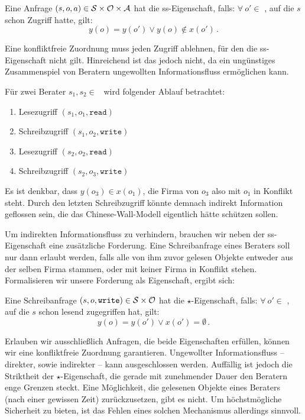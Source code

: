 \begin{definition}\indexCWSimpleSecurity
  Eine Anfrage $(s, o, a) \in \mathcal{S} \times \mathcal{O} \times \mathcal{A}$ hat die
  ss-Eigenschaft, falls: \(\forall\ o' \in\) \calO, auf die \(s\) schon
  Zugriff hatte, gilt:
  \[
    y(o) = y(o') \lor y(o) \notin x(o')\, .
  \]
\end{definition}

Eine konfliktfreie Zuordnung muss jeden Zugriff ablehnen, für den die
ss-Eigenschaft nicht gilt. Hinreichend ist das jedoch nicht, da ein
ungünstiges Zusammenspiel von Beratern ungewollten Informationsfluss
ermöglichen kann. 

\begin{beispiel}
  Für zwei Berater \(s_1, s_2 \in\) \calS\ wird folgender Ablauf betrachtet:
  \begin{multicols}{2}
    \begin{enumerate}
    \item Lesezugriff \((s_1, o_1, \texttt{read})\)
    \item Schreibzugriff \((s_1, o_2, \texttt{write})\)
    \item Lesezugriff \((s_2, o_2, \texttt{read})\)
    \item Schreibzugriff \((s_2, o_3, \texttt{write})\)
    \end{enumerate}
  \end{multicols}
  Es ist denkbar, dass \(y(o_3) \in x(o_1)\), die Firma von \(o_3\) also
  mit \(o_1\) in Konflikt steht. Durch den letzten Schreibzugriff könnte
  demnach indirekt Information geflossen sein, die das
  Chinese-Wall-Modell eigentlich hätte schützen sollen.  
\end{beispiel}

Um indirekten Informationsfluss zu verhindern, brauchen wir neben der
ss-Eigenschaft eine zusätzliche Forderung. Eine Schreibanfrage eines
Beraters soll nur dann erlaubt werden, falls alle von ihm zuvor gelesen
Objekte entweder aus der selben Firma stammen, oder mit keiner Firma in
Konflikt stehen. Formalisieren wir unsere Forderung als Eigenschaft,
ergibt sich:

\begin{definition}\indexCWStarProperty
  Eine Schreibanfrage $(s, o, \texttt{write}) \in \mathcal{S} \times \mathcal{O}$
  hat die \(\star\)-Eigenschaft, falls: \(\forall\ o' \in\) \calO, auf
  die \(s\) schon lesend zugegriffen hat, gilt: 
  \[
    y(o) = y(o') \lor x(o') = \emptyset\, .
  \]
\end{definition}

Erlauben wir ausschließlich Anfragen, die beide Eigenschaften erfüllen,
können wir eine konfliktfreie Zuordnung garantieren. Ungewollter
Informationsfluss -- direkter, sowie indirekter -- kann ausgeschlossen
werden. Auffällig ist jedoch die Striktheit der \(\star\)-Eigenschaft,
die gerade mit zunehmender Dauer den Beratern enge Grenzen steckt. Eine
Möglichkeit, die gelesenen Objekte eines Beraters (nach einer gewissen
Zeit) zurückzusetzen, gibt es nicht. Um höchstmögliche Sicherheit zu
bieten, ist das Fehlen eines solchen Mechanismus allerdings sinnvoll.

